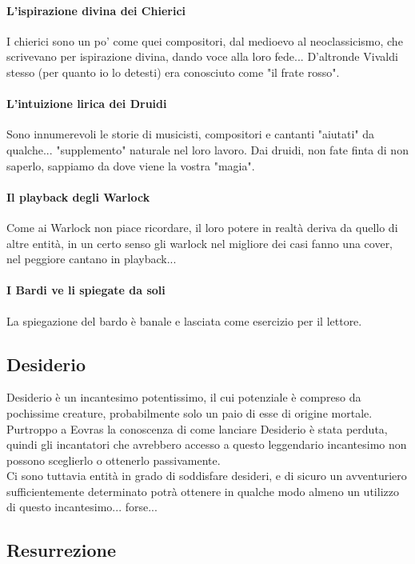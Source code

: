 \paragraph{L'ispirazione divina dei Chierici}I chierici sono un po' come quei compositori, dal medioevo al neoclassicismo, che scrivevano per ispirazione divina, dando voce alla loro fede... D'altronde Vivaldi stesso (per quanto io lo detesti) era conosciuto come "il frate rosso".
\paragraph{L'intuizione lirica dei Druidi}Sono innumerevoli le storie di musicisti, compositori e cantanti "aiutati" da qualche... "supplemento" naturale nel loro lavoro. Dai druidi, non fate finta di non saperlo, sappiamo da dove viene la vostra "magia".
\paragraph{Il playback degli Warlock}Come ai Warlock non piace ricordare, il loro potere in realtà deriva da quello di altre entità, in un certo senso gli warlock nel migliore dei casi fanno una cover, nel peggiore cantano in playback...
\paragraph{I Bardi ve li spiegate da soli}La spiegazione del bardo è banale e lasciata come esercizio per il lettore.

\subsection{Desiderio}

Desiderio è un incantesimo potentissimo, il cui potenziale è compreso da pochissime creature, probabilmente solo un paio di esse di origine mortale. \\ Purtroppo a Eovras la conoscenza di come lanciare Desiderio è stata perduta, quindi gli incantatori che avrebbero accesso a questo leggendario incantesimo non possono sceglierlo o ottenerlo passivamente. \\ Ci sono tuttavia entità in grado di soddisfare desideri, e di sicuro un avventuriero sufficientemente determinato potrà ottenere in qualche modo almeno un utilizzo di questo incantesimo... forse...

\subsection{Resurrezione}

